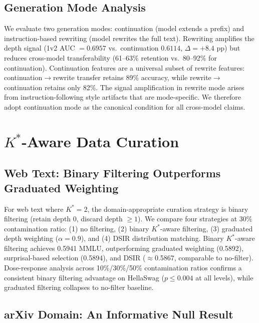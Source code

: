 \documentclass[11pt,a4paper]{article}
\begin{document}
\subsection{Generation Mode Analysis}
\label{sec:genmode}

We evaluate two generation modes: continuation (model extends a prefix) and instruction-based rewriting (model rewrites the full text). Rewriting amplifies the depth signal (1v2 AUC $= 0.6957$ vs.\ continuation $0.6114$, $\Delta = +8.4$ pp) but reduces cross-model transferability (61--63\% retention vs.\ 80--92\% for continuation). Continuation features are a universal subset of rewrite features: continuation$\to$rewrite transfer retains 89\% accuracy, while rewrite$\to$continuation retains only 82\%. The signal amplification in rewrite mode arises from instruction-following style artifacts that are mode-specific. We therefore adopt continuation mode as the canonical condition for all cross-model claims.


\section{$K^*$-Aware Data Curation}
\label{sec:curation}

\subsection{Web Text: Binary Filtering Outperforms Graduated Weighting}

For web text where $K^*\!=\!2$, the domain-appropriate curation strategy is binary filtering (retain depth 0, discard depth $\ge 1$). We compare four strategies at 30\% contamination ratio: (1) no filtering, (2) binary $K^*$-aware filtering, (3) graduated depth weighting ($\alpha\!=\!0.9$), and (4) DSIR distribution matching. Binary $K^*$-aware filtering achieves 0.5941 MMLU, outperforming graduated weighting (0.5892), surprisal-based selection (0.5894), and DSIR ($\approx$0.5867, comparable to no-filter). Dose-response analysis across 10\%/30\%/50\% contamination ratios confirms a consistent binary filtering advantage on HellaSwag ($p \le 0.004$ at all levels), while graduated filtering collapses to no-filter baseline.

\subsection{arXiv Domain: An Informative Null Result}
\label{sec:arxiv_null}
\end{document}
